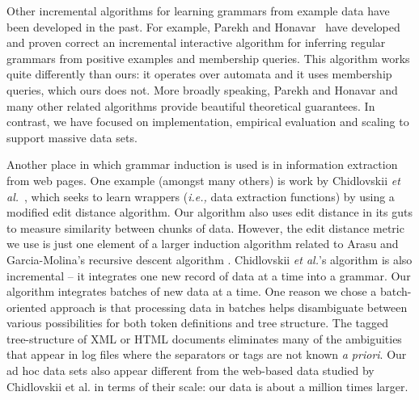 Other incremental algorithms for learning grammars from example data
have been developed in the past.  For example, Parekh and 
Honavar~\cite{parekh+:incremental} have developed and proven correct
an incremental interactive algorithm for inferring
regular grammars from positive examples and membership queries.
This algorithm works quite differently than ours:  it operates over
automata and it uses membership queries, which ours does not.
More broadly speaking, Parekh and Honavar and many other related algorithms
provide beautiful theoretical guarantees.  In contrast, we have
focused on implementation, empirical 
evaluation and scaling to support massive data sets.

Another place in which grammar induction is used is in information
extraction from web pages.  One example (amongst many others) is
work by Chidlovskii {\em et al.}~\cite{chidlovskii+:wrapper-generation},
which seeks to learn wrappers ({\em i.e.,} data extraction functions)
by using a modified edit distance algorithm.  Our algorithm also
uses edit distance in its guts to measure similarity
between chunks of data.  However, the edit distance metric we use is just
one element of a larger induction algorithm related to Arasu and
Garcia-Molina's recursive descent algorithm \cite{arasu+:sigmod03}.
Chidlovskii {\em et al.}'s algorithm is also incremental -- it
integrates one new record of data at a time into a grammar.
Our algorithm integrates batches of new data at a time.  One
reason we chose a batch-oriented approach is that processing
data in batches helps
disambiguate between various possibilities for both token
definitions and tree structure.  The tagged tree-structure of
XML or HTML documents eliminates many of the ambiguities that
appear in log files where the separators or tags are not known
{\em a priori}.  Our ad hoc data sets also appear different
from the web-based data studied by Chidlovskii {et al.} in terms of their
scale: our data is about a million times larger.

